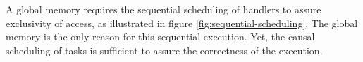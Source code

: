 
\begin{figure}%
  \centering{}%
\end{figure}

A global memory requires the sequential scheduling of handlers to assure exclusivity of access, as illustrated in figure \ref{fig:sequential-scheduling}. %
The global memory is the only reason for this sequential execution.
Yet, the causal scheduling of tasks is sufficient to assure the correctness of the execution.

